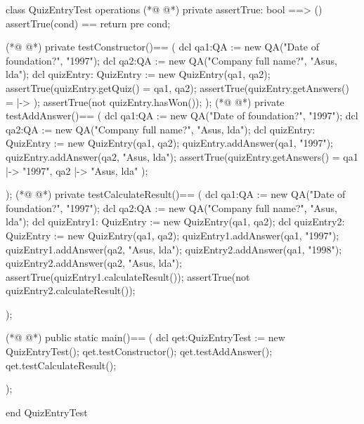 \begin{vdmpp}[breaklines=true]
class QuizEntryTest
 operations
(*@
\label{assertTrue:3}
@*)
  private assertTrue: bool ==> ()
    assertTrue(cond) == return
    pre cond;
    
(*@
\label{testConstructor:7}
@*)
  private testConstructor()==
  (
   dcl qa1:QA := new QA("Date of foundation?", "1997");
   dcl qa2:QA := new QA("Company full name?", "Asus, lda");
   dcl quizEntry: QuizEntry := new QuizEntry({qa1, qa2});
   assertTrue(quizEntry.getQuiz() = {qa1, qa2});
   assertTrue(quizEntry.getAnswers() = { |-> });
   assertTrue(not quizEntry.hasWon());
  );
(*@
\label{testAddAnswer:16}
@*)
  private testAddAnswer()==
  (
   dcl qa1:QA := new QA("Date of foundation?", "1997");
   dcl qa2:QA := new QA("Company full name?", "Asus, lda");
   dcl quizEntry: QuizEntry := new QuizEntry({qa1, qa2});
   quizEntry.addAnswer(qa1, "1997");
   quizEntry.addAnswer(qa2, "Asus, lda");
   assertTrue(quizEntry.getAnswers() = { qa1 |-> "1997", qa2 |-> "Asus, lda" });
   
  );
(*@
\label{testCalculateResult:26}
@*)
  private testCalculateResult()==
  (
   dcl qa1:QA := new QA("Date of foundation?", "1997");
   dcl qa2:QA := new QA("Company full name?", "Asus, lda");
   dcl quizEntry1: QuizEntry := new QuizEntry({qa1, qa2});
   dcl quizEntry2: QuizEntry := new QuizEntry({qa1, qa2});
   quizEntry1.addAnswer(qa1, "1997");
   quizEntry1.addAnswer(qa2, "Asus, lda");
   quizEntry2.addAnswer(qa1, "1998");
   quizEntry2.addAnswer(qa2, "Asus, lda");
   assertTrue(quizEntry1.calculateResult());
   assertTrue(not quizEntry2.calculateResult());
   
  );
  
(*@
\label{main:41}
@*)
  public static main()==
    (
   dcl qet:QuizEntryTest := new QuizEntryTest();
   qet.testConstructor();
   qet.testAddAnswer();
   qet.testCalculateResult();

    );
     
end QuizEntryTest
\end{vdmpp}
